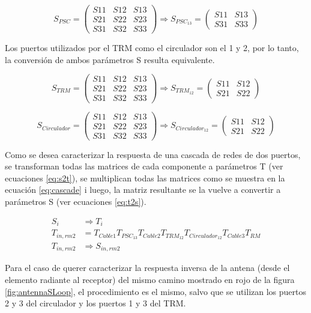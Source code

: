$$
	S_{PSC} = \begin{pmatrix} S11&S12&S13 \\ S21&S22&S23 \\ S31&S32&S33\end{pmatrix} \Rightarrow
	S_{PSC_{13}} = \begin{pmatrix} S11&S13 \\ S31&S33 \end{pmatrix}
$$

Los puertos utilizados por el TRM como el circulador son el 1 y 2, por lo tanto, la conversión de ambos parámetros S resulta
equivalente.

$$
	S_{TRM} = \begin{pmatrix} S11&S12&S13 \\ S21&S22&S23 \\ S31&S32&S33\end{pmatrix} \Rightarrow
	S_{TRM_{12}} = \begin{pmatrix} S11&S12 \\ S21&S22 \end{pmatrix}
$$

$$
	S_{Circulador} = \begin{pmatrix} S11&S12&S13 \\ S21&S22&S23 \\ S31&S32&S33\end{pmatrix} \Rightarrow
	S_{Circulador_{12}} = \begin{pmatrix} S11&S12 \\ S21&S22 \end{pmatrix}
$$

Como se desea caracterizar la respuesta de una cascada de redes de dos puertos, se transforman todas las matrices de cada
componente a parámetros T (ver ecuaciones \ref{eq:s2t}), se multiplican todas las matrices como se muestra en la ecuación
\ref{eq:cascade} i luego, la matriz resultante se la vuelve a convertir a parámetros S (ver ecuaciones \ref{eq:t2s}).

$$
\begin{aligned}
	S_i &\Rightarrow T_i \\
	T_{in,rm2} &= T_{Cable1}T_{PSC_{13}}T_{Cable2}T_{TRM_{12}}T_{Circulador_{12}}T_{Cable3}T_{RM}\\
	T_{in,rm2} &\Rightarrow S_{in,rm2}
\end{aligned}
$$

Para el caso de querer caracterizar la respuesta inversa de la antena (desde el elemento radiante al receptor) del mismo camino
mostrado en rojo de la figura \ref{fig:antennaSLoop}, el procedimiento es el mismo, salvo que se utilizan los puertos 2 y 3 del
circulador y los puertos 1 y 3 del TRM.

